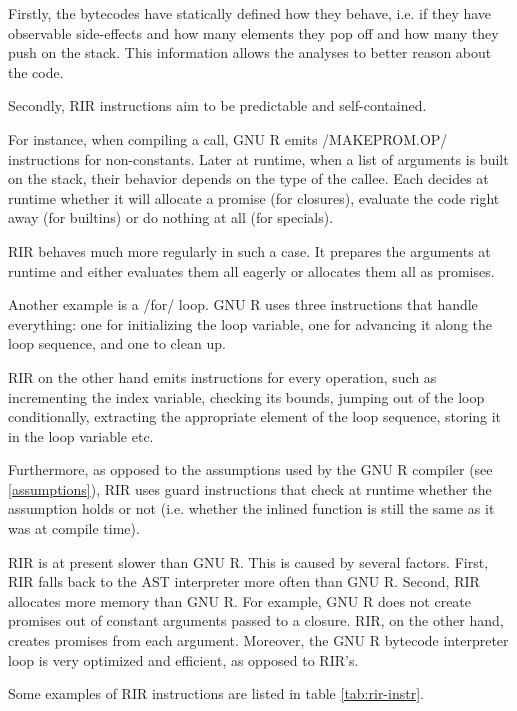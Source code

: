 Firstly, the bytecodes have statically defined how they behave, i.e. if they have observable side-effects and how many elements they pop off and how many they push on the stack. This information allows the analyses to better reason about the code.

Secondly, RIR instructions aim to be predictable and self-contained.

For instance, when compiling a call, GNU R emits \rinline/MAKEPROM.OP/ instructions for non-constants. Later at runtime, when a list of arguments is built on the stack, their behavior depends on the type of the callee. Each decides at runtime whether it will allocate a promise (for closures), evaluate the code right away (for builtins) or do nothing at all (for specials).

RIR behaves much more regularly in such a case. It prepares the arguments at runtime and either evaluates them all eagerly or allocates them all as promises.

Another example is a \rinline/for/ loop. GNU R uses three instructions that handle everything: one for initializing the loop variable, one for advancing it along the loop sequence, and one to clean up.

RIR on the other hand emits instructions for every operation, such as incrementing the index variable, checking its bounds, jumping out of the loop conditionally, extracting the appropriate element of the loop sequence, storing it in the loop variable etc.

Furthermore, as opposed to the assumptions used by the GNU R compiler (see \ref{assumptions}), RIR uses guard instructions that check at runtime whether the assumption holds or not (i.e. whether the inlined function is still the same as it was at compile time).

RIR is at present slower than GNU R. This is caused by several factors. First, RIR falls back to the AST interpreter more often than GNU R. Second, RIR allocates more memory than GNU R. For example, GNU R does not create promises out of constant arguments passed to a closure. RIR, on the other hand, creates promises from each argument. Moreover, the GNU R bytecode interpreter loop is very optimized and efficient, as opposed to RIR's.

Some examples of RIR instructions are listed in table \ref{tab:rir-instr}.

